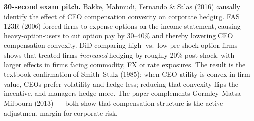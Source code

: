 \documentclass[11pt]{article}
\begin{document}
\begin{keybox}
\textbf{30-second exam pitch.} Bakke, Mahmudi, Fernando \& Salas (2016) causally identify the effect of CEO compensation convexity on corporate hedging. FAS 123R (2006) forced firms to expense options on the income statement, causing heavy-option-users to cut option pay by 30--40\% and thereby lowering CEO compensation convexity. DiD comparing high- vs.\ low-pre-shock-option firms shows that treated firms \emph{increased} hedging by roughly 20\% post-shock, with larger effects in firms facing commodity, FX or rate exposures. The result is the textbook confirmation of Smith--Stulz (1985): when CEO utility is convex in firm value, CEOs prefer volatility and hedge less; reducing that convexity flips the incentive, and managers hedge more. The paper complements Gormley--Matsa--Milbourn (2013) --- both show that compensation structure is the active adjustment margin for corporate risk.
\end{keybox}
\end{document}
